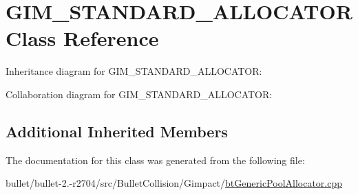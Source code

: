 \hypertarget{class_g_i_m___s_t_a_n_d_a_r_d___a_l_l_o_c_a_t_o_r}{\section{G\+I\+M\+\_\+\+S\+T\+A\+N\+D\+A\+R\+D\+\_\+\+A\+L\+L\+O\+C\+A\+T\+O\+R Class Reference}
\label{class_g_i_m___s_t_a_n_d_a_r_d___a_l_l_o_c_a_t_o_r}
}


Inheritance diagram for G\+I\+M\+\_\+\+S\+T\+A\+N\+D\+A\+R\+D\+\_\+\+A\+L\+L\+O\+C\+A\+T\+O\+R\+:


Collaboration diagram for G\+I\+M\+\_\+\+S\+T\+A\+N\+D\+A\+R\+D\+\_\+\+A\+L\+L\+O\+C\+A\+T\+O\+R\+:
\subsection*{Additional Inherited Members}


The documentation for this class was generated from the following file\+:\begin{DoxyCompactItemize}
\item 
bullet/bullet-\/2.-\/r2704/src/\+Bullet\+Collision/\+Gimpact/\hyperlink{bt_generic_pool_allocator_8cpp}{bt\+Generic\+Pool\+Allocator.\+cpp}\end{DoxyCompactItemize}
